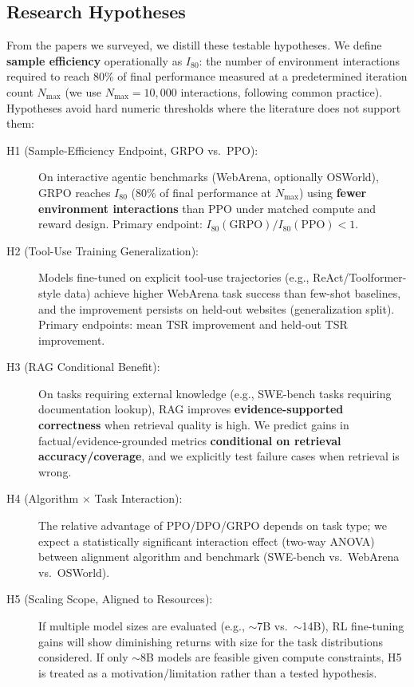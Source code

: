 \documentclass[12pt,a4paper]{report}
\theoremstyle{definition}
\begin{document}
\subsection{Research Hypotheses}
From the papers we surveyed, we distill these testable hypotheses. We define \textbf{sample efficiency} operationally as $I_{80}$: the number of environment interactions required to reach 80\% of final performance measured at a predetermined iteration count $N_{\max}$ (we use $N_{\max} = 10{,}000$ interactions, following common practice). Hypotheses avoid hard numeric thresholds where the literature does not support them:

\begin{description}
    \item[H1 (Sample-Efficiency Endpoint, GRPO vs.\ PPO):] On interactive agentic benchmarks (WebArena, optionally OSWorld), GRPO reaches $I_{80}$ (80\% of final performance at $N_{\max}$) using \textbf{fewer environment interactions} than PPO under matched compute and reward design. Primary endpoint: $I_{80}(\text{GRPO}) / I_{80}(\text{PPO}) < 1$.

    \item[H2 (Tool-Use Training Generalization):] Models fine-tuned on explicit tool-use trajectories (e.g., ReAct/Toolformer-style data) achieve higher WebArena task success than few-shot baselines, and the improvement persists on held-out websites (generalization split). Primary endpoints: mean TSR improvement and held-out TSR improvement.

    \item[H3 (RAG Conditional Benefit):] On tasks requiring external knowledge (e.g., SWE-bench tasks requiring documentation lookup), RAG improves \textbf{evidence-supported correctness} when retrieval quality is high. We predict gains in factual/evidence-grounded metrics \textbf{conditional on retrieval accuracy/coverage}, and we explicitly test failure cases when retrieval is wrong.

    \item[H4 (Algorithm $\times$ Task Interaction):] The relative advantage of PPO/DPO/GRPO depends on task type; we expect a statistically significant interaction effect (two-way ANOVA) between alignment algorithm and benchmark (SWE-bench vs.\ WebArena vs.\ OSWorld).

    \item[H5 (Scaling Scope, Aligned to Resources):] If multiple model sizes are evaluated (e.g., $\sim$7B vs.\ $\sim$14B), RL fine-tuning gains will show diminishing returns with size for the task distributions considered. If only $\sim$8B models are feasible given compute constraints, H5 is treated as a motivation/limitation rather than a tested hypothesis.
\end{description}
\end{document}
